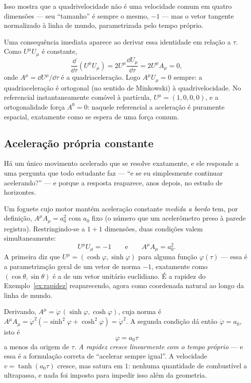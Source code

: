 \documentclass[12pt,a4paper,oneside]{book}
\theoremstyle{rgplain}
\theoremstyle{rgremark}
\begin{document}
Isso mostra que a quadrivelocidade não é uma velocidade comum em quatro
dimensões --- seu ``tamanho'' é sempre o mesmo, $-1$ --- mas o vetor tangente
normalizado à linha de mundo, parametrizada pelo tempo próprio.

Uma consequência imediata aparece ao derivar essa identidade em relação a
$\tau$. Como $U^\mu U_\mu$ é constante,
\[
  \frac{\dd}{\dd\tau}\left(U^\mu U_\mu\right)=2U^\mu\frac{\dd U_\mu}{\dd\tau}
  =2U^\mu A_\mu=0,
\]
onde $A^\mu=\dd U^\mu/\dd\tau$ é a quadriaceleração. Logo $A^\mu U_\mu=0$
sempre: a quadriaceleração é ortogonal (no sentido de Minkowski) à
quadrivelocidade. No referencial instantaneamente comóvel à partícula,
$U^\mu=(1,0,0,0)$, e a ortogonalidade força $A^0=0$: naquele referencial a
aceleração é puramente espacial, exatamente como se espera de uma força
comum.

\subsection*{Aceleração própria constante}
\label{sec:aceleracao-propria}

Há um único movimento acelerado que se resolve exatamente, e ele responde a
uma pergunta que todo estudante faz --- ``e
se eu simplesmente continuar acelerando?'' --- e porque a resposta reaparece,
anos depois, no estudo de horizontes.

Um foguete cujo motor mantém aceleração constante \emph{medida a bordo} tem,
por definição, $A^\mu A_\mu=a_0^2$ com $a_0$ fixo (o número que um
acelerômetro preso à parede registra). Restringindo-se a $1+1$ dimensões,
duas condições valem simultaneamente:
\[
  U^\mu U_\mu=-1
  \qquad\text{e}\qquad
  A^\mu A_\mu=a_0^2 .
\]
A primeira diz que $U^\mu=(\cosh\varphi,\sinh\varphi)$ para alguma função
$\varphi(\tau)$ --- essa é a parametrização geral de um vetor de norma $-1$,
exatamente como $(\cos\theta,\sin\theta)$ é a de um vetor unitário
euclidiano. É a rapidez do Exemplo~\ref{ex:rapidez} reaparecendo, agora
como coordenada natural ao longo da linha de mundo.

Derivando, $A^\mu=\dot\varphi\,(\sinh\varphi,\cosh\varphi)$, cuja norma é
$A^\mu A_\mu=\dot\varphi^2(-\sinh^2\varphi+\cosh^2\varphi)=\dot\varphi^2$. A
segunda condição dá então $\dot\varphi=a_0$, isto é
\[
  \varphi=a_0\tau
\]
a menos da origem de $\tau$. \emph{A rapidez cresce linearmente com o tempo
próprio} --- e essa é a formulação correta de ``acelerar sempre igual''. A
velocidade $v=\tanh(a_0\tau)$ cresce, mas satura em $1$: nenhuma quantidade de
combustível a ultrapassa, e nada foi imposto para impedir isso além da
geometria.
\end{document}
